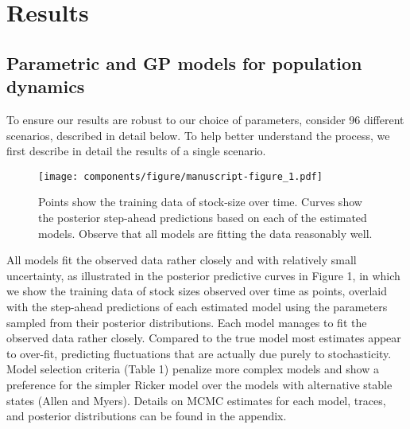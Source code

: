 \documentclass[author-year, 12pt,review]{components/elsarticle} %
\makeatletter
\def\maxwidth{\ifdim\Gin@nat@width>\linewidth\linewidth
\else\Gin@nat@width\fi}
\let\Oldincludegraphics\includegraphics
\renewcommand{\includegraphics}[1]{\Oldincludegraphics[width=\maxwidth]{#1}}
\makeatother
\begin{document}
\section{Results}\label{results}

\subsection{Parametric and GP models for population
dynamics}\label{parametric-and-gp-models-for-population-dynamics}

To ensure our results are robust to our choice of parameters, consider
96 different scenarios, described in detail below. To help better
understand the process, we first describe in detail the results of a
single scenario.

\begin{figure}[htbp]
\centering
\texttt{[image: components/figure/manuscript-figure\_1.pdf]}
\caption{Points show the training data of stock-size over time. Curves
show the posterior step-ahead predictions based on each of the estimated
models. Observe that all models are fitting the data reasonably well.}
\end{figure}

All models fit the observed data rather closely and with relatively
small uncertainty, as illustrated in the posterior predictive curves in
Figure 1, in which we show the training data of stock sizes observed
over time as points, overlaid with the step-ahead predictions of each
estimated model using the parameters sampled from their posterior
distributions. Each model manages to fit the observed data rather
closely. Compared to the true model most estimates appear to over-fit,
predicting fluctuations that are actually due purely to stochasticity.
Model selection criteria (Table 1) penalize more complex models and show
a preference for the simpler Ricker model over the models with
alternative stable states (Allen and Myers). Details on MCMC estimates
for each model, traces, and posterior distributions can be found in the
appendix.
\end{document}
